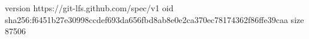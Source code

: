 version https://git-lfs.github.com/spec/v1
oid sha256:f6451b27e30998ccdef693da656fbd8ab8e0e2ca370ec78174362f86ffe39caa
size 87506
